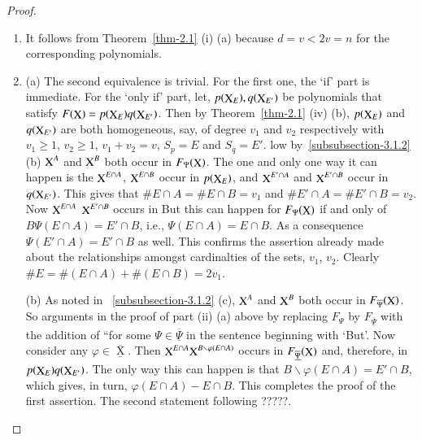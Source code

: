 \documentclass[a4paper,12pt]{article}
\DeclareMathOperator{\x}{\mathrm{X}}
\theoremstyle{definition}
\theoremstyle{underlinethm}
\theoremstyle{definition}
\begin{document}
\begin{proof}
\begin{enumerate}[label=(\roman*)]
 
 \item  It follows from Theorem~\eqref{thm-2.1} (i) (a) because $d=v < 2 v =n$ for the corresponding polynomials. 

\item (a) The second equivalence is trivial. For the first one, the `if' part is immediate. For the  `only if' part, let, $p(\bold{\x}_{E}), q (\bold{\x}_{E'})$ be polynomials that satisfy $F(\bold{\x}) = p(\bold{\x}_{E}) q(\bold{\x}_{E'})$. Then by Theorem~\eqref{thm-2.1} (iv) (b), $p(\bold{\x}_{E})$ and $q(\bold{\x}_{E'})$ are both homogeneous, say, of degree $v_{1}$ and $v_{2}$ respectively with $v_{1} \geq 1$, $v_{2} \geq 1$, $v_{1} + v_{2} = v$, $S_{p} =E$ and $S_{q} = E'$.  low by~\eqref{subsubsection-3.1.2} (b) $\bold{\x}^{A}$ and $\bold{\x}^{B}$ both occur in $F_{\Psi}(\bold{\x})$. The one and only one way it can happen is the $\bold{\x}^{E \cap A}$, $\bold{\x}^{E \cap B}$ occur in $p(\bold{\x}_{E})$, and $\bold{\x}^{E' \cap A}$ and $\bold{\x}^{E' \cap B}$ occur in $q(\bold{\x}_{E'})$. This gives that $\# E \cap A = \# E \cap B = v_{1}$ and $\# E' \cap A = \# E' \cap B =v_{2}$. Now $\bold{\x}^{E \cap A}$ $\bold{\x}^{E' \cap B}$ occurs in But this can happen for $F_{\Psi} (\bold{\x})$ if and only of $B \Psi(E \cap A) = E' \cap B$, i.e., $\Psi(E \cap A) = E \cap B$. As a consequence $\Psi (E' \cap A) = E' \cap B$ as well. This confirms the assertion already made about the relationships amongst cardinalties of the sets, $v_{1}$, $v_{2}$. Clearly $\# E = \# (E \cap A) + \# (E \cap B) = 2 v_{1}$.

(b) As noted in ~\eqref{subsubsection-3.1.2} (c), $\bold{\x}^{A}$ and $\bold{\x}^{B}$ both occur in $F_{\overline{\Psi}}(\bold{\x})$. So arguments in the proof of part (ii) (a) above by replacing $F_{\Psi}$ by $F_{\underline{\overline{\Psi}}}$ with the addition of ``for some $\Psi \in \underline{\overline{\Psi}}$ in the sentence beginning with `But'. Now consider any $\varphi \in \underline{\overline{\x}}$. Then $\bold{\x}^{E \cap A} \bold{\x}^{B \smallsetminus \varphi (E \cap A)}$ occurs in $F_{\underline{\overline{\Psi}}}(\bold{\x})$ and, therefore, in $p(\bold{\x}_{E}) q(\bold{\x}_{E'})$. The only way this can happen is that $B \smallsetminus \varphi (E \cap A) = E' \cap B$, which gives, in turn, $\varphi(E \cap A) - E \cap B$. This completes the proof of the first assertion. The second statement following ?????.


\end{enumerate}
\end{proof}
\end{document}

